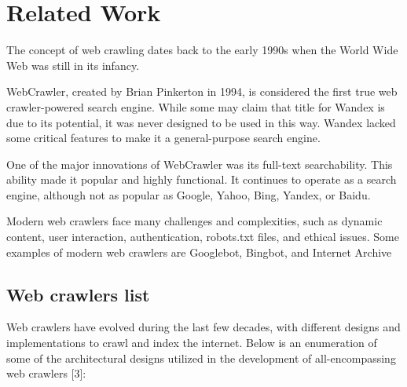 \chapter{Related Work}
\label{chap:relatedwork}
The concept of web crawling dates back to the early 1990s when the World Wide Web was still in its infancy.

WebCrawler, created by Brian Pinkerton in 1994, is considered the first true web crawler-powered search engine. While some may claim that title for Wandex is due to its potential, it was never designed to be used in this way. Wandex lacked some critical features to make it a general-purpose search engine.

One of the major innovations of WebCrawler was its full-text searchability. This ability made it popular and highly functional. It continues to operate as a search engine, although not as popular as Google, Yahoo, Bing, Yandex, or Baidu.

Modern web crawlers face many challenges and complexities, such as dynamic content, user interaction, authentication, robots.txt files, and ethical issues. Some examples of modern web crawlers are Googlebot, Bingbot, and Internet Archive

\section{Web crawlers list}
Web crawlers have evolved during the last few decades, with different designs and implementations to crawl and index the internet. Below is an enumeration of some of the architectural designs utilized in the development of all-encompassing web crawlers [3]:


